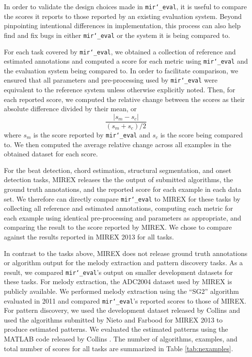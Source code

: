 \documentclass{article}
\def\mireval{\texttt{mir\char`_eval}}
\begin{document}
In order to validate the design choices made in \mireval{}, it is useful to compare the scores it reports to those reported by an existing evaluation system.
Beyond pinpointing intentional differences in implementation, this process can also help find and fix bugs in either \mireval{} or the system it is being compared to.

For each task covered by \mireval{}, we obtained a collection of reference and estimated annotations and computed a score for each metric using \mireval{} and the evaluation system being compared to.
In order to facilitate comparison, we ensured that all parameters and pre-processing used by \mireval{} were equivalent to the reference system unless otherwise explicitly noted.
Then, for each reported score, we computed the relative change between the scores as their absolute difference divided by their mean, or
$$
\frac{|s_m - s_c|}{(s_m + s_c)/2}
$$
where $s_m$ is the score reported by \mireval{} and $s_c$ is the score being compared to.
We then computed the average relative change across all examples in the obtained dataset for each score.

For the beat detection, chord estimation, structural segmentation, and onset detection tasks, MIREX releases the the output of submitted algorithms, the ground truth annotations, and the reported score for each example in each data set.
We therefore can directly compare \mireval{} to MIREX for these tasks by collecting all reference and estimated annotations, computing each metric for each example using identical pre-processing and parameters as appropriate, and comparing the result to the score reported by MIREX.
We chose to compare against the results reported in MIREX 2013 for all tasks.

In contrast to the tasks above, MIREX does not release ground truth annotations or algorithm output for the melody extraction and pattern discovery tasks.
As a result, we compared \mireval{}'s output on smaller development datasets for these tasks.
For melody extraction, the ADC2004 dataset used by MIREX is publicly available.
We performed melody extraction using the ``SG2'' algorithm evaluated in 2011 \cite{salamon:MelodyExraction:TASLP:12} and compared \mireval{}'s reported scores to those of MIREX.
For pattern discovery, we used the development dataset released by Collins \cite{Collins2013} and used the algorithms submitted by Nieto and Farbood \cite{nieto2013discovery} for MIREX 2013 to produce estimated patterns.
We evaluated the estimated patterns using the MATLAB code released by Collins \cite{Collins2013}.
The number of algorithms, examples, and total number of scores for all tasks are summarized in Table \ref{tab:nexamples}.
\end{document}
